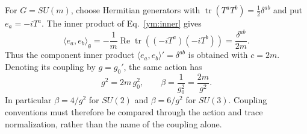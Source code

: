 For $G=SU(m)$, choose Hermitian generators with
$\operatorname{tr}(T^aT^b)=\tfrac12\delta^{ab}$ and put $e_a=-iT^a$.
The inner product of Eq.~\eqref{ym:inner} gives
\begin{equation}\label{ym:fundamental-normalization}
 \langle e_a,e_b\rangle_{\mathfrak g}
 =-\frac1m\operatorname{Re}\operatorname{tr}((-iT^a)(-iT^b))
 =\frac{\delta^{ab}}{2m}.
\end{equation}
Thus the component inner product $\langle e_a,e_b\rangle'=\delta^{ab}$
is obtained with $c=2m$. Denoting its coupling by $g=g_0'$, the same action
has
\begin{equation}\label{ym:coupling-dictionary}
 g^2=2m\,g_0^2,\qquad \beta=\frac{1}{g_0^2}=\frac{2m}{g^2}.
\end{equation}
In particular $\beta=4/g^2$ for $SU(2)$ and $\beta=6/g^2$ for $SU(3)$.
Coupling conventions must therefore be compared through the action and
trace normalization, rather than the name of the coupling alone.


